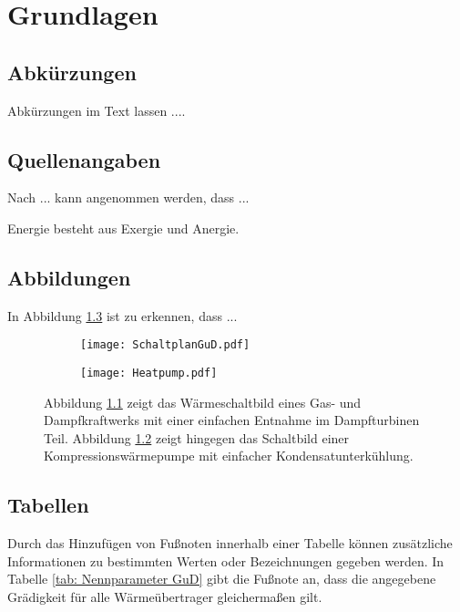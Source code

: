 
\chapter{Grundlagen}\label{chapter: Grundlagen}	

	\section{Abkürzungen}
	Abkürzungen im Text lassen ....
	
	
	\section{Quellenangaben}
	Nach ... kann angenommen werden, dass ...
	
	Energie besteht aus Exergie und Anergie.
	
	
	\section{Abbildungen}
	In Abbildung \ref{fig: Abbildung X} ist zu erkennen, dass ... 
	\begin{figure}[ht]
		\begin{subfigure}[b]{0.49\textwidth}
			\texttt{[image: SchaltplanGuD.pdf]}
			\label{subfigure: Schaltplan_GuD}
		\end{subfigure}
		\hfill
		\begin{subfigure}[b]{0.49\textwidth}
			\texttt{[image: Heatpump.pdf]}
			\label{subfigure: Schaltbild_Heatpump}
		\end{subfigure}
		\caption[Gegenüberstellung Gas- und Dampfkraftwerk mit Wärmepumpe]{Abbildung \ref{subfigure: Schaltplan_GuD} zeigt das Wärmeschaltbild eines Gas- und Dampfkraftwerks mit einer einfachen Entnahme im Dampfturbinen Teil. Abbildung \ref{subfigure: Schaltbild_Heatpump} zeigt hingegen das Schaltbild einer Kompressionswärmepumpe mit einfacher Kondensatunterkühlung.}
		\label{fig: Abbildung X}
	\end{figure}
	
	
	\section{Tabellen}
	Durch das Hinzufügen von Fußnoten innerhalb einer Tabelle können zusätzliche Informationen zu bestimmten Werten oder Bezeichnungen gegeben werden. In Tabelle \ref{tab: Nennparameter GuD} gibt die Fußnote an, dass die angegebene Grädigkeit für alle Wärmeübertrager gleichermaßen gilt.
	
